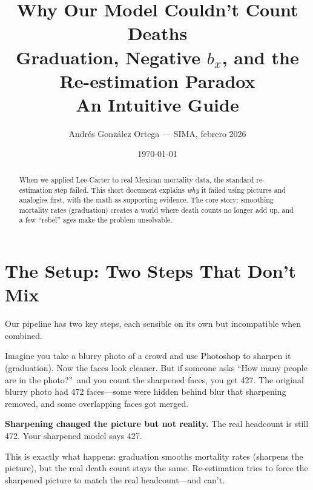\documentclass[11pt, a4paper]{article}
\newcommand{\bx}{b_x}
\begin{document}
\title{\textbf{Why Our Model Couldn't Count Deaths} \\[0.5em]
\large Graduation, Negative $\bx$, and the Re-estimation Paradox \\[0.3em]
\normalsize An Intuitive Guide}
\author{Andr\'{e}s Gonz\'{a}lez Ortega --- SIMA, febrero 2026}
\date{\today}

\maketitle

\begin{abstract}
When we applied Lee-Carter to real Mexican mortality data, the standard
re-estimation step failed. This short document explains \emph{why} it failed
using pictures and analogies first, with the math as supporting evidence.
The core story: smoothing mortality rates (graduation) creates a world
where death counts no longer add up, and a few ``rebel'' ages make
the problem unsolvable.
\end{abstract}

\tableofcontents
\newpage

\section{The Setup: Two Steps That Don't Mix}

Our pipeline has two key steps, each sensible on its own but
incompatible when combined.

\begin{intuition}
Imagine you take a blurry photo of a crowd and use Photoshop to
sharpen it (graduation). Now the faces look cleaner. But if someone
asks ``How many people are in the photo?''\ and you count the sharpened
faces, you get 427. The original blurry photo had 472 faces---some were
hidden behind blur that sharpening removed, and some overlapping faces
got merged.

\medskip
\textbf{Sharpening changed the picture but not reality.} The real
headcount is still 472. Your sharpened model says 427.

\medskip
This is exactly what happens: graduation smooths mortality rates
(sharpens the picture), but the real death count stays the same.
Re-estimation tries to force the sharpened picture to match the
real headcount---and can't.
\end{intuition}
\end{document}
